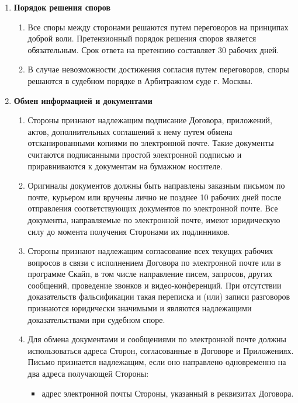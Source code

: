 \documentclass[14pt,a4paper]{article}
\begin{document}
\begin{enumerate}
	\item
	\begin{center}
	\textbf{Порядок решения споров}
	\end{center}
	\begin{enumerate}
		\item Все споры между сторонами решаются путем переговоров на принципах доброй воли. Претензионный порядок решения споров является обязательным. Срок ответа на претензию составляет 30 рабочих дней.

		\item В случае невозможности достижения согласия путем переговоров, споры решаются в судебном порядке в Арбитражном суде г. Москвы.
	\end{enumerate}

	\item
	\begin{center}
	\textbf{Обмен информацией и документами}
	\end{center}
	\begin{enumerate}
		\item Стороны признают надлежащим подписание Договора, приложений, актов, дополнительных соглашений к нему путем обмена отсканированными копиями по электронной почте. Такие документы считаются подписанными простой электронной подписью и приравниваются к документам на бумажном носителе.

		\item Оригиналы документов должны быть направлены заказным письмом по почте, курьером или вручены лично не позднее 10 рабочих дней после отправления соответствующих документов по электронной почте. Все документы, направляемые по электронной почте, имеют юридическую силу до момента получения Сторонами их подлинников.
		
		\item Стороны признают надлежащим согласование всех текущих рабочих вопросов в связи с исполнением Договора по электронной почте или в программе Скайп, в том числе направление писем, запросов, других сообщений, проведение звонков и видео-конференций. При отсутствии доказательств фальсификации такая переписка и (или) записи разговоров признаются юридически значимыми и являются надлежащими доказательствами при судебном споре.
		
		\item Для обмена документами и сообщениями по электронной почте должны использоваться адреса Сторон, согласованные в Договоре и Приложениях. Письмо признается надлежащим, если оно направлено одновременно на два адреса получающей Стороны:
		\begin{itemize}
			\item адрес электронной почты Стороны, указанный в реквизитах Договора.


\end{itemize}
\end{enumerate}
\end{enumerate}
\end{document}
